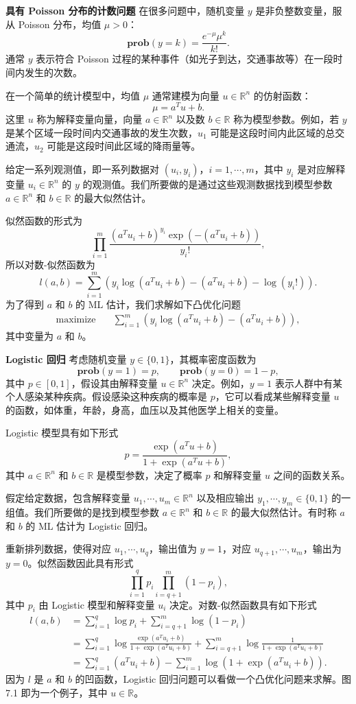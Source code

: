 \documentclass[UTF8,12pt,a4paper,fontset=fandol]{ctexart}
\begin{document}
\noindent\textbf{具有 Poisson 分布的计数问题}\quad
在很多问题中，随机变量 $y$ 是非负整数变量，服从 Poisson 分布，均值 $\mu>0$：
\[
\mathbf{prob}(y=k)=\frac{e^{-\mu}\mu^k}{k!}.
\]
通常 $y$ 表示符合 Poisson 过程的某种事件（如光子到达，交通事故等）在一段时间内发生的次数。

在一个简单的统计模型中，均值 $\mu$ 通常建模为向量 $u\in\mathbb{R}^n$ 的仿射函数：
\[
\mu=a^T u+b.
\]
这里 $u$ 称为解释变量向量，向量 $a\in\mathbb{R}^n$ 以及数 $b\in\mathbb{R}$ 称为模型参数。例如，若 $y$ 是某个区域一段时间内交通事故的发生次数，$u_1$ 可能是这段时间内此区域的总交通流，$u_2$ 可能是这段时间此区域的降雨量等。

给定一系列观测值，即一系列数据对 $(u_i,y_i)$，$i=1,\cdots,m$，其中 $y_i$ 是对应解释变量 $u_i\in\mathbb{R}^n$ 的 $y$ 的观测值。我们所要做的是通过这些观测数据找到模型参数 $a\in\mathbb{R}^n$ 和 $b\in\mathbb{R}$ 的最大似然估计。

似然函数的形式为
\[
\prod_{i=1}^m \frac{(a^T u_i+b)^{y_i}\exp(-(a^T u_i+b))}{y_i!},
\]
所以对数-似然函数为
\[
l(a,b)=\sum_{i=1}^m\left(y_i\log(a^T u_i+b)-(a^T u_i+b)-\log(y_i!)\right).
\]
为了得到 $a$ 和 $b$ 的 ML 估计，我们求解如下凸优化问题
\[
\begin{aligned}
\text{maximize}\quad & \sum_{i=1}^m \left(y_i\log(a^T u_i+b)-(a^T u_i+b)\right),
\end{aligned}
\]
其中变量为 $a$ 和 $b$。

\noindent\textbf{Logistic 回归}\quad
考虑随机变量 $y\in\{0,1\}$，其概率密度函数为
\[
\mathbf{prob}(y=1)=p,\qquad \mathbf{prob}(y=0)=1-p,
\]
其中 $p\in[0,1]$，假设其由解释变量 $u\in\mathbb{R}^n$ 决定。例如，$y=1$ 表示人群中有某个人感染某种疾病。假设感染这种疾病的概率是 $p$，它可以看成某些解释变量 $u$ 的函数，如体重，年龄，身高，血压以及其他医学上相关的变量。

Logistic 模型具有如下形式
\begin{equation}
p=\frac{\exp(a^T u+b)}{1+\exp(a^T u+b)},
\tag{7.3}
\end{equation}
其中 $a\in\mathbb{R}^n$ 和 $b\in\mathbb{R}$ 是模型参数，决定了概率 $p$ 和解释变量 $u$ 之间的函数关系。

假定给定数据，包含解释变量 $u_1,\cdots,u_m\in\mathbb{R}^n$ 以及相应输出 $y_1,\cdots,y_m\in\{0,1\}$ 的一组值。我们所要做的是找到模型参数 $a\in\mathbb{R}^n$ 和 $b\in\mathbb{R}$ 的最大似然估计。有时称 $a$ 和 $b$ 的 ML 估计为 Logistic 回归。

重新排列数据，使得对应 $u_1,\cdots,u_q$，输出值为 $y=1$，对应 $u_{q+1},\cdots,u_m$，输出为 $y=0$。似然函数因此具有形式
\[
\prod_{i=1}^q p_i\prod_{i=q+1}^m (1-p_i),
\]
其中 $p_i$ 由 Logistic 模型和解释变量 $u_i$ 决定。对数-似然函数具有如下形式
\[
\begin{aligned}
l(a,b)
&=\sum_{i=1}^q \log p_i+\sum_{i=q+1}^m\log(1-p_i)\\
&=\sum_{i=1}^q \log\frac{\exp(a^T u_i+b)}{1+\exp(a^T u_i+b)}
+\sum_{i=q+1}^m \log\frac{1}{1+\exp(a^T u_i+b)}\\
&=\sum_{i=1}^q (a^T u_i+b)-\sum_{i=1}^m \log(1+\exp(a^T u_i+b)).
\end{aligned}
\]
因为 $l$ 是 $a$ 和 $b$ 的凹函数，Logistic 回归问题可以看做一个凸优化问题来求解。图 7.1 即为一个例子，其中 $u\in\mathbb{R}$。
\end{document}
